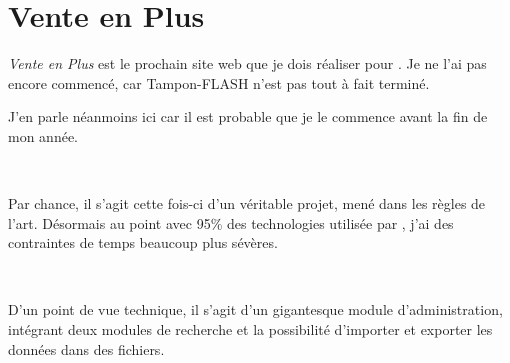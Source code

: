 \chapter{Vente en Plus}
\emph{Vente en Plus} est le prochain site web que je dois réaliser pour \fidit. Je ne l'ai pas encore commencé, car Tampon-FLASH n'est pas tout à fait terminé.

J'en parle néanmoins ici car il est probable que je le commence avant la fin de mon année.

~

Par chance, il s'agit cette fois-ci d'un véritable projet, mené dans les règles de l'art. Désormais au point avec 95\% des technologies utilisée par \fidit, j'ai des contraintes de temps beaucoup plus sévères.

~

D'un point de vue technique, il s'agit d'un gigantesque module d'administration, intégrant deux modules de recherche et la possibilité d'importer et exporter les données dans des fichiers.
